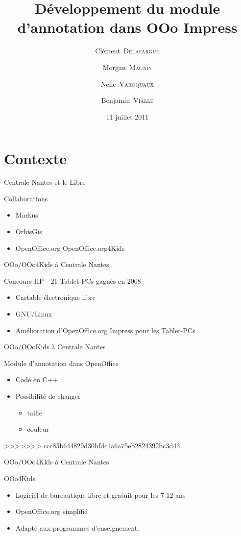 \documentclass[handout]{beamer}
\title{Développement du module d'annotation dans OOo Impress}
\author{Clément~\textsc{Delafargue} \and Morgan~\textsc{Magnin} \and Nelle~\textsc{Varoquaux}\and Benjamin~\textsc{Vialle}}
\institute[\textsc{ECN}]{École Centrale de Nantes}
\date{11 juillet 2011}
\begin{document}
\frame{\titlepage}

\section{Contexte}

\begin{frame}{Centrale Nantes et le Libre}
    \begin{block}{Collaborations}
	\begin{itemize}[<+->]
	    \item Markus
	    \item OrbisGis
	    \item OpenOffice.org OpenOffice.org4Kids
	\end{itemize}
    \end{block}
\end{frame}

\begin{frame}{OOo/OOo4Kids à Centrale Nantes}
    \begin{block}{Concours HP - 21 Tablet PCs gagnés en 2008}
	\begin{itemize}[<+->]
	    \item Cartable électronique libre
            \item GNU/Linux
            \item Amélioration d'OpenOffice.org Impress pour les Tablet-PCs
	\end{itemize}
    \end{block}
\end{frame}

\begin{frame}{OOo/OOoKids à Centrale Nantes}
    \begin{block}{Module d'annotation dans OpenOffice}
	\begin{itemize}
	    \item Codé en C++
	    \item Possibilité de changer
	    \begin{itemize}
		\item taille
		\item couleur
	    \end{itemize}
	\end{itemize}
    \end{block}
\end{frame}

>>>>>>> ccc85b644829d30bfdc1a6a75eb2824392bc3d43
\begin{frame}{OOo/OOo4Kids à Centrale Nantes}
    \begin{block}{OOo4Kids}
	\begin{itemize}[<+->]
	    \item Logiciel de bureautique libre et gratuit pour les 7-12 ans
	    \item OpenOffice.org simplifié
	    \item Adapté aux programmes d'enseignement.
	\end{itemize}
    \end{block}
\end{frame}
\end{document}
